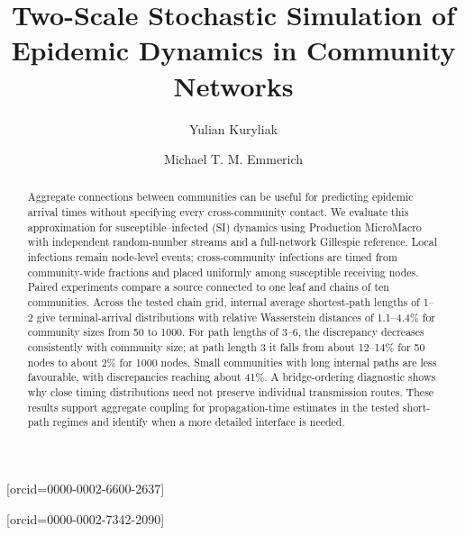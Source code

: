 \documentclass[a4paper,fleqn]{cas-sc}
\begin{document}
\let\WriteBookmarks\relax
\def\floatpagepagefraction{1}
\def\textpagefraction{.001}


\title[mode=title]{Two-Scale Stochastic Simulation of Epidemic Dynamics in Community Networks}

\author[1]{Yulian Kuryliak}[orcid=0000-0002-6600-2637]
\cormark[1]

\author[2]{Michael T. M. Emmerich}[orcid=0000-0002-7342-2090]


\begin{abstract}
Aggregate connections between communities can be useful for predicting epidemic arrival times without specifying every cross-community contact. We evaluate this approximation for susceptible--infected (SI) dynamics using Production MicroMacro with independent random-number streams and a full-network Gillespie reference. Local infections remain node-level events; cross-community infections are timed from community-wide fractions and placed uniformly among susceptible receiving nodes. Paired experiments compare a source connected to one leaf and chains of ten communities. Across the tested chain grid, internal average shortest-path lengths of 1--2 give terminal-arrival distributions with relative Wasserstein distances of 1.1--4.4\% for community sizes from 50 to 1000. For path lengths of 3--6, the discrepancy decreases consistently with community size; at path length 3 it falls from about 12--14\% for 50 nodes to about 2\% for 1000 nodes. Small communities with long internal paths are less favourable, with discrepancies reaching about 41\%. A bridge-ordering diagnostic shows why close timing distributions need not preserve individual transmission routes. These results support aggregate coupling for propagation-time estimates in the tested short-path regimes and identify when a more detailed interface is needed.
\end{abstract}
\end{document}
